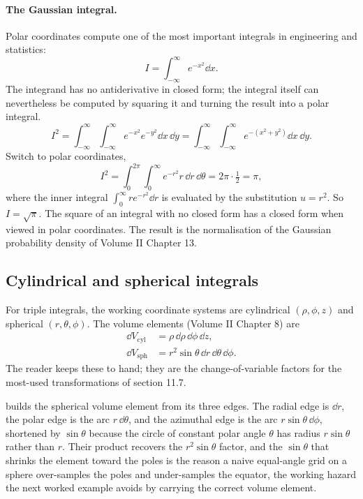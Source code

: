 \paragraph{The Gaussian integral.} Polar coordinates compute one of
the most important integrals in engineering and statistics:
\[
I = \int_{-\infty}^{\infty} e^{-x^{2}} \dd x.
\]
The integrand has no antiderivative in closed form; the integral
itself can nevertheless be computed by squaring it and turning the
result into a polar integral.
\[
I^{2} = \!\int_{-\infty}^{\infty}\!\int_{-\infty}^{\infty}
e^{-x^{2}} e^{-y^{2}} \dd x\,\dd y =
\!\int_{-\infty}^{\infty}\!\int_{-\infty}^{\infty}
e^{-(x^{2} + y^{2})} \dd x\,\dd y.
\]
Switch to polar coordinates,
\[
I^{2} = \int_{0}^{2\pi}\!\int_{0}^{\infty} e^{-r^{2}} r \,\dd r\,
\dd\theta = 2\pi \cdot \tfrac{1}{2} = \pi,
\]
where the inner integral $\int_{0}^{\infty} r e^{-r^{2}} \dd r$ is
evaluated by the substitution $u = r^{2}$. So $I = \sqrt{\pi}$. The
square of an integral with no closed form has a closed form when
viewed in polar coordinates. The result is the normalisation of the
Gaussian probability density of Volume II Chapter 13.

\subsection{Cylindrical and spherical integrals}

For triple integrals, the working coordinate systems are cylindrical
$(\rho, \phi, z)$ and spherical $(r, \theta, \phi)$. The volume
elements (Volume II Chapter 8) are
\begin{align*}
\dd V_{\text{cyl}} &= \rho \,\dd\rho\,\dd\phi\,\dd z, \\
\dd V_{\text{sph}} &= r^{2} \sin\theta\,\dd r\,\dd\theta\,\dd\phi.
\end{align*}
The reader keeps these to hand; they are the change-of-variable
factors for the most-used transformations of section 11.7.



 builds the spherical volume
element from its three edges. The radial edge is $\dd r$, the polar edge
is the arc $r\,\dd\theta$, and the azimuthal edge is the arc
$r\sin\theta\,\dd\phi$, shortened by $\sin\theta$ because the circle of
constant polar angle $\theta$ has radius $r\sin\theta$ rather than $r$.
Their product recovers the $r^{2}\sin\theta$ factor, and the $\sin\theta$
that shrinks the element toward the poles is the reason a naive
equal-angle grid on a sphere over-samples the poles and under-samples the
equator, the working hazard the next worked example avoids by carrying
the correct volume element.

